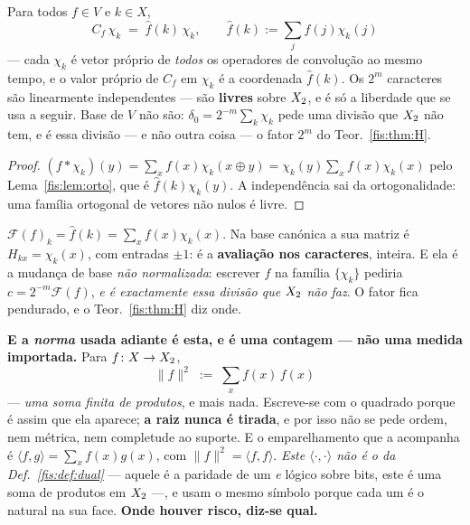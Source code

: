 \documentclass[livro.tex]{subfiles}
\begin{document}
\begin{teorema}\label{fis:thm:proprios}
Para todos $f\in V$ e $k\in X$,
\[
\boxed{\;C_f\,\chi_k \;=\; \widehat{f}(k)\,\chi_k,\qquad
\widehat{f}(k):=\sum_j f(j)\chi_k(j)\;}
\]
--- cada $\chi_k$ é vetor próprio de \emph{todos} os operadores de convolução ao
mesmo tempo, e o valor próprio de $C_f$ em $\chi_k$ é a coordenada
$\widehat{f}(k)$. Os $2^{m}$ caracteres são linearmente independentes --- são
\textbf{livres} sobre $X_2$, e é só a liberdade que se usa a seguir. Base de $V$
não são: $\delta_0=2^{-m}\sum_k\chi_k$ pede uma divisão que $X_2$ não tem, e é
essa divisão --- e não outra coisa --- o fator $2^{m}$ do Teor.~\ref{fis:thm:H}.\end{teorema}

\begin{proof}
$(f*\chi_k)(y)=\sum_x f(x)\chi_k(x\oplus y)=\chi_k(y)\sum_x f(x)\chi_k(x)$ pelo
Lema~\ref{fis:lem:orto}, que é $\widehat{f}(k)\chi_k(y)$. A independência sai da
ortogonalidade: uma família ortogonal de vetores não nulos é livre.
\end{proof}

\begin{definicao}[a transformada]\label{fis:def:transf}
$\mathcal{F}(f)_k=\widehat{f}(k)=\sum_x f(x)\chi_k(x)$. Na base canónica a sua
matriz é $H_{kx}=\chi_k(x)$, com entradas $\pm1$: é a \textbf{avaliação nos
caracteres}, inteira. E ela é a mudança de base \emph{não normalizada}: escrever $f$ na família
$\{\chi_k\}$ pediria $c=2^{-m}\mathcal{F}(f)$, \emph{e é exactamente essa divisão
que $X_2$ não faz}. O fator fica pendurado, e o Teor.~\ref{fis:thm:H} diz onde.

\medskip\noindent\textbf{E a \emph{norma} usada adiante é esta, e é uma contagem
--- não uma medida importada.} Para $f\colon X\to X_2$,
\[
\boxed{\;\lVert f\rVert^{2}\;:=\;\sum_{x}f(x)\,f(x)\;}
\]
--- \emph{uma soma finita de produtos}, e mais nada. Escreve-se com o quadrado
porque é assim que ela aparece; \textbf{a raiz nunca é tirada}, e por isso não se
pede ordem, nem métrica, nem completude ao suporte. E o emparelhamento que a
acompanha é $\langle f,g\rangle=\sum_x f(x)g(x)$, com
$\lVert f\rVert^{2}=\langle f,f\rangle$. \emph{Este $\langle\cdot,\cdot\rangle$
não é o da Def.~\ref{fis:def:dual}} --- aquele é a paridade de um \emph{e} lógico
sobre bits, este é uma soma de produtos em $X_2$ ---, e usam o mesmo símbolo
porque cada um é o natural na sua face. \textbf{Onde houver risco, diz-se qual.}
\end{definicao}
\end{document}
